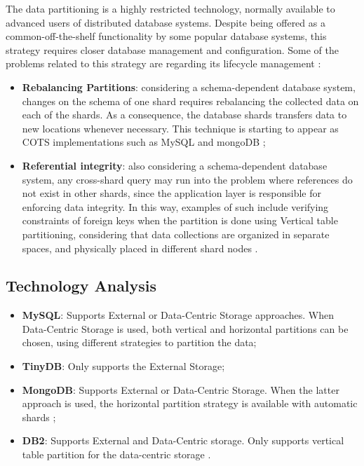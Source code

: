 The data partitioning is a highly restricted technology, normally available to
advanced users of distributed database systems. Despite being offered as a
common-off-the-shelf functionality by some popular database systems, this
strategy requires closer database management and configuration. Some of the
problems related to this strategy are regarding its lifecycle management
\cite{db-shard-discussion}:

\begin{itemize}
  \item \textbf{Rebalancing Partitions}: considering a schema-dependent database
  system, changes on the schema of one shard requires rebalancing the
  collected data on each of the shards. As a consequence, the database shards
  transfers data to new locations whenever necessary. This technique is
  starting to appear as COTS implementations such as MySQL \cite{mysql} and
  mongoDB \cite{mongodb};
  \item \textbf{Referential integrity}: also considering a schema-dependent
  database system, any cross-shard query may run into the problem where
  references do not exist in other shards, since the application layer is
  responsible for enforcing data integrity. In this way, examples of such
  include verifying constraints of foreign keys when the partition is done
  using Vertical table partitioning, considering that data collections are
  organized in separate spaces, and physically placed in different shard nodes
  \cite{db-partitioning-relational}.
\end{itemize}

\subsection{Technology Analysis}

\begin{itemize}
  \item \textbf{MySQL}: Supports External or Data-Centric Storage approaches.
  When Data-Centric Storage is used, both vertical and horizontal partitions
  \cite{db-partitioning-relational} can be chosen, using different strategies
  to partition the data;
  \item \textbf{TinyDB}: Only supports the External Storage;
  \item \textbf{MongoDB}: Supports External or Data-Centric Storage. When the
  latter approach is used, the horizontal partition strategy is available with
  automatic shards \cite{db-mongo-partition};
  \item \textbf{DB2}: Supports External and Data-Centric storage. Only supports
  vertical table partition for the data-centric storage \cite{db-db2-partition}.
\end{itemize}

